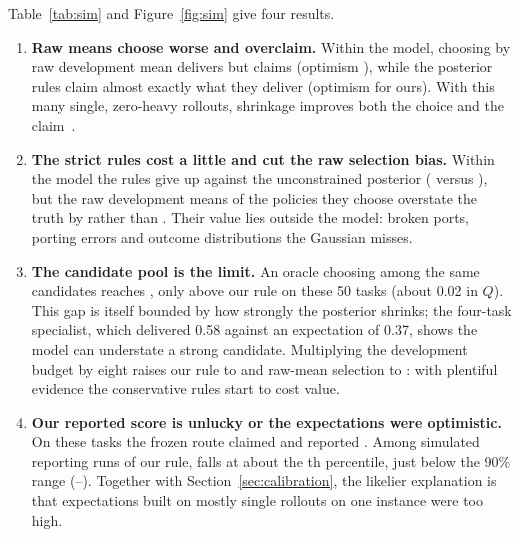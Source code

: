 \documentclass[10pt]{article}
\newcommand{\Q}{\ensuremath{Q}}
\begin{document}
Table~\ref{tab:sim} and Figure~\ref{fig:sim} give four results.
\begin{enumerate}
\item \textbf{Raw means choose worse and overclaim.} Within the model, choosing by raw development mean delivers \SimNaiveTrue{} but claims \SimNaiveClaim{} (optimism \SimNaiveOpt), while the posterior rules claim almost exactly what they deliver (optimism \SimStrictOpt{} for ours). With this many single, zero-heavy rollouts, shrinkage improves both the choice and the claim~\cite{efron2011tweedie}.
\item \textbf{The strict rules cost a little and cut the raw selection bias.} Within the model the rules give up \SimCostOfRules{} against the unconstrained posterior (\SimStrictTrue{} versus \SimPostTrue), but the raw development means of the policies they choose overstate the truth by \SimStrictRaw{} rather than \SimPostRaw. Their value lies outside the model: broken ports, porting errors and outcome distributions the Gaussian misses.
\item \textbf{The candidate pool is the limit.} An oracle choosing among the same candidates reaches \SimOracle, only \SimStrictRegret{} above our rule on these 50 tasks (about 0.02 in \Q). This gap is itself bounded by how strongly the posterior shrinks; the four-task specialist, which delivered 0.58 against an expectation of 0.37, shows the model can understate a strong candidate. Multiplying the development budget by eight raises our rule to \SimStrictEight{} and raw-mean selection to \SimNaiveEight: with plentiful evidence the conservative rules start to cost value.
\item \textbf{Our reported score is unlucky or the expectations were optimistic.} On these tasks the frozen route claimed \ObsClaimed{} and reported \ObsRealized. Among simulated reporting runs of our rule, \ObsRealized{} falls at about the \ObsPct{}th percentile, just below the 90\% range (\ObsLo--\ObsHi). Together with Section~\ref{sec:calibration}, the likelier explanation is that expectations built on mostly single rollouts on one instance were too high.
\end{enumerate}
\end{document}
